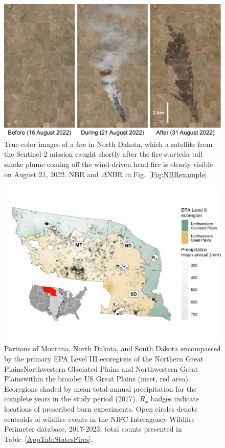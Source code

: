 \documentclass[fire,article,submit,oneauthor,pdftex]{Definitions/mdpi}
\begin{document}
\begin{figure}[H]
	\centering
	\includegraphics[width=1\columnwidth]{SatelliteFireSpread.png}
	\caption{True-color images of a fire in North Dakota, which a satellite from the Sentinel-2 mission caught shortly after the fire started\textemdash a tall smoke plume coming off the wind-driven head fire is clearly visible on August 21, 2022.
	NBR and $\Delta$NBR in Fig.~\ref{Fig:NBRexample}.  }
	\label{Fig:TrueColor} %
\end{figure}

\begin{figure}[H]
	\centering
	\includegraphics[width=1\columnwidth]{region_map-1.png}
	\caption{Portions of Montana, North Dakota, and South Dakota encompassed by the primary EPA Level III ecoregions of the Northern Great Plains\textemdash Northwestern Glaciated Plains and Northwestern Great Plains\textemdash within the broader US Great Plains (inset, red area). 
	Ecoregions shaded by mean total annual precipitation for the complete years in the study period (2017). 
	$R_{x}$ badges indicate locations of prescribed burn experiments. 
	Open circles denote centroids of wildfire events in the NIFC Interagency Wildfire Perimeter database, 2017-2023; total counts presented in Table~\ref{AppTab:StatesFires}. }
	\label{AppFig:RegionMap} %
\end{figure}
\end{document}
